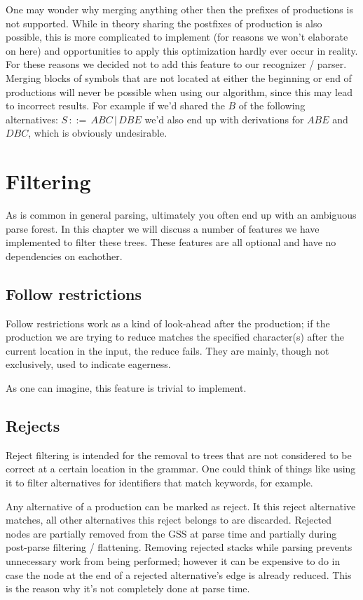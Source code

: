 \documentclass[a4paper,10pt]{article}
\begin{document}
One may wonder why merging anything other then the prefixes of productions is not supported. While in theory sharing the postfixes of production is also possible, this is more complicated to implement (for reasons we won't elaborate on here) and opportunities to apply this optimization hardly ever occur in reality. For these reasons we decided not to add this feature to our recognizer / parser. Merging blocks of symbols that are not located at either the beginning or end of productions will never be possible when using our algorithm, since this may lead to incorrect results. For example if we'd shared the $B$ of the following alternatives: $S\,::=\,ABC\,|\,DBE$ we'd also end up with derivations for $ABE$ and $DBC$, which is obviously undesirable.

\section{Filtering}

As is common in general parsing, ultimately you often end up with an ambiguous parse forest. In this chapter we will discuss a number of features we have implemented to filter these trees. These features are all optional and have no dependencies on eachother.

\subsection{Follow restrictions}

Follow restrictions work as a kind of look-ahead after the production; if the production we are trying to reduce matches the specified character(s) after the current location in the input, the reduce fails. They are mainly, though not exclusively, used to indicate eagerness.

As one can imagine, this feature is trivial to implement.

\subsection{Rejects}

Reject filtering is intended for the removal to trees that are not considered to be correct at a certain location in the grammar. One could think of things like using it to filter alternatives for identifiers that match keywords, for example.

Any alternative of a production can be marked as reject. It this reject alternative matches, all other alternatives this reject belongs to are discarded. Rejected nodes are partially removed from the GSS at parse time and partially during post-parse filtering / flattening. Removing rejected stacks while parsing prevents unnecessary work from being performed; however it can be expensive to do in case the node at the end of a rejected alternative's edge is already reduced. This is the reason why it's not completely done at parse time.
\end{document}
